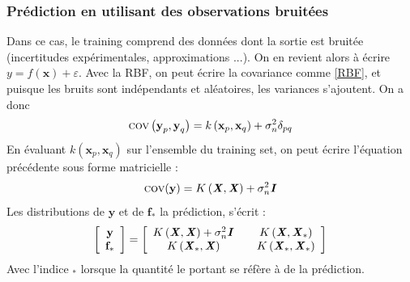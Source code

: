 \documentclass[a4paper,12pt]{report}
\newcommand{\bepar}[1]{
	\left( #1 \right)  
}
\numberwithin{equation}{section} %
\begin{document}
\subsubsection*{Prédiction en utilisant des observations bruitées}
Dans ce cas, le training comprend des données dont la sortie est bruitée (incertitudes expérimentales, approximations ...). On en revient alors à écrire $y = f(\textbf{x}) + \varepsilon$. Avec la RBF, on peut écrire la covariance comme \eqref{RBF}, et puisque les bruits sont indépendants et aléatoires, les variances s'ajoutent. On a donc 
\begin{equation*}
\textsc{cov}\bepar{\textbf{y}_p, \textbf{y}_q} = k\bepar{\textbf{x}_p, \textbf{x}_q} + \sigma_n^2 \delta_{pq}
\end{equation*}
En évaluant $k\bepar{\textbf{x}_p, \textbf{x}_q}$ sur l'ensemble du training set, on peut écrire l'équation précédente sous forme matricielle :
\begin{equation}
\textsc{cov}(\textbf{y}) = K\bepar{\textbf{\textit{X}}, \textbf{\textit{X}}} + \sigma_n^2\textbf{\textit{I}}
\end{equation}
Les distributions de $\textbf{y}$ et de $\textbf{f}_*$ la prédiction, s'écrit :
\begin{equation}
\left[ \begin{array}{c} 
 \textbf{y} \\ \textbf{f}_* \end{array}
\right] = \left[\begin{array}{c@{\qquad}c} K\left(\textbf{\textit{X}}, \textbf{\textit{X}}\right) + \sigma_n^2\textbf{\textit{I}}& K\bepar{\textbf{\textit{X}}, \textbf{\textit{X}}_*}\\ K\bepar{\textbf{\textit{X}}_*, \textbf{\textit{X}}} & K\bepar{\textbf{\textit{X}}_*, \textbf{\textit{X}}_*}\\  \end{array}\right]
\end{equation}
Avec l'indice $_*$ lorsque la quantité le portant se réfère à de la prédiction.\\
\end{document}
